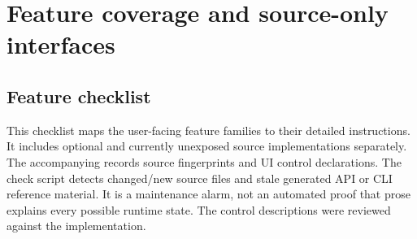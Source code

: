 \chapter{Feature coverage and source-only interfaces}\label{ch:coverage}
\section{Feature checklist}
This checklist maps the user-facing feature families to their detailed instructions. It includes optional and currently unexposed source implementations separately. The accompanying  records source fingerprints and UI control declarations. The check script detects changed/new source files and stale generated API or CLI reference material. It is a maintenance alarm, not an automated proof that prose explains every possible runtime state. The control descriptions were reviewed against the implementation.

